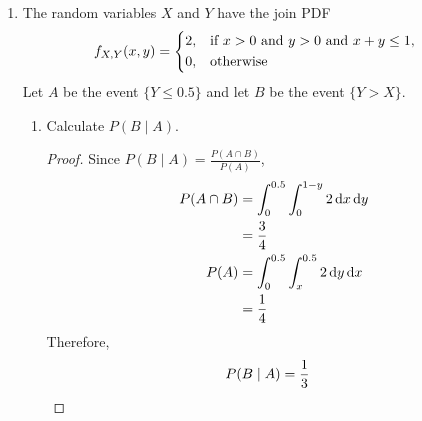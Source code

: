 \documentclass[paper=usletter, fontsize=12pt]{article}
\begin{document}
\begin{enumerate}
\begin{enumerate}
\begin{proof}
                Variance of uniform distribution
                \begin{align*}
                    E[X^2] & = \frac{26.67+40}{2}\int_{26.67}^{40}x^2\diff{x} + \frac{20+30}{2}\int_{20}^{30}x^2\diff{x}\\
                    & = 65691\\
                    var(X) & = E[X^2] - (E[X])^2\\
                    & = 65691 - (30.56)^2  \qedhere
                \end{align*}
                \endgroup

            \end{proof}

        \end{enumerate}

        \item The random variables $X$ and $Y$ have the join PDF
        \begin{align*}
            f_{X,Y}(x,y) & =
            \begin{dcases}
                2, & \text{if $x > 0$ and $y>0$ and $x+y\le 1$},\\
                0, & \text{otherwise}
            \end{dcases}
        \end{align*}
        Let $A$ be the event $\{Y \le 0.5\}$ and let $B$ be the event
        $\{Y>X\}$.
        \begin{enumerate}

            \item Calculate $P(B \mid A)$.
            \begin{proof}

                Since $P(B \mid A) = \frac{P(A \cap B)}{P(A)}$,
                \begin{align*}
                    P(A \cap B) & = \int_{0}^{0.5}\int_{0}^{1-y}2\mathop{}\!\mathrm{d}{x}\mathop{}\!\mathrm{d}{y} \\
                    & = \frac{3}{4} \\
                    P(A) & = \int_{0}^{0.5}\int_{x}^{0.5}2\mathop{}\!\mathrm{d}{y}\mathop{}\!\mathrm{d}{x} \\
                    & = \frac{1}{4}
                \end{align*}
                \endgroup
                Therefore,
                \begin{align*}
                    P(B \mid A) & = \frac{1}{3} \qedhere
                \end{align*}


\end{proof}
\end{enumerate}
\end{enumerate}
\end{document}
